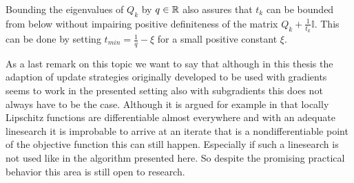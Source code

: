 \begin{remark}
	Bounding the eigenvalues of \(Q_k\) by \(q \in \mathbb{R}\) also assures that \(t_k\) can be bounded from below without impairing positive definiteness of the matrix \(Q_k+\frac{1}{t_k}\mathbb{I}\). This can be done by setting \(t_{min} = \frac{1}{q} - \xi \) for a small positive constant \(\xi\).
\end{remark} 

As a last remark on this topic we want to say that although in this thesis the adaption of update strategies originally developed to be used with gradients seems to work in the presented setting also with subgradients this does not always have to be the case.
Although it is argued for example in \cite{Lewis2008} that locally Lipschitz functions are differentiable almost everywhere and with an adequate linesearch it is improbable to arrive at an iterate that is a nondifferentiable point of the objective function this can still happen. Especially if such a linesearch is not used like in the algorithm presented here.
So despite the promising practical behavior this area is still open to research.








 

